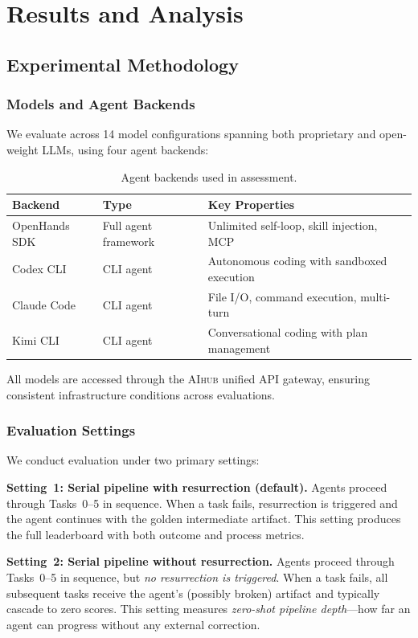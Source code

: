 \section{Results and Analysis}
\subsection{Experimental Methodology}
\subsubsection{Models and Agent Backends}

We evaluate \eva{} across 14 model configurations spanning both proprietary and open-weight LLMs, using four agent backends:

\begin{table}[!t]
\centering
\caption{Agent backends used in \eva{} assessment.}
\small
\begin{tabular}{lll}
\toprule
\textbf{Backend} & \textbf{Type} & \textbf{Key Properties} \\
\midrule
OpenHands SDK & Full agent framework & Unlimited self-loop, skill injection, MCP \\
Codex CLI & CLI agent & Autonomous coding with sandboxed execution \\
Claude Code & CLI agent & File I/O, command execution, multi-turn \\
Kimi CLI & CLI agent & Conversational coding with plan management \\
\bottomrule
\end{tabular}
\label{tab:backends}
\end{table}

All models are accessed through the \textsc{AIhub} unified API gateway, ensuring consistent infrastructure conditions across evaluations.

\subsubsection{Evaluation Settings}

We conduct evaluation under two primary settings:

\textbf{Setting~1: Serial pipeline with resurrection (default).}
Agents proceed through Tasks~0--5 in sequence.
When a task fails, resurrection is triggered and the agent continues with the golden intermediate artifact.
This setting produces the full leaderboard with both outcome and process metrics.

\textbf{Setting~2: Serial pipeline without resurrection.}
Agents proceed through Tasks~0--5 in sequence, but \emph{no resurrection is triggered}.
When a task fails, all subsequent tasks receive the agent's (possibly broken) artifact and typically cascade to zero scores.
This setting measures \emph{zero-shot pipeline depth}---how far an agent can progress without any external correction.


